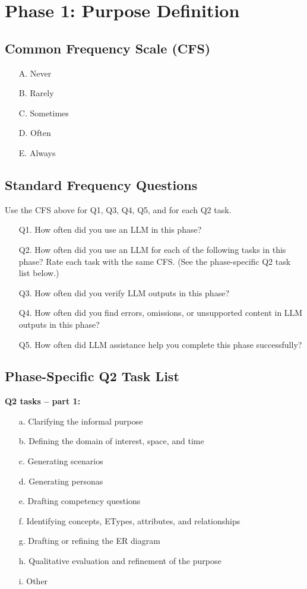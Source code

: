\section*{Phase 1: Purpose Definition}

\subsection*{Common Frequency Scale (CFS)}
\begin{itemize}
  \item[A.] Never
  \item[B.] Rarely
  \item[C.] Sometimes
  \item[D.] Often
  \item[E.] Always
\end{itemize}

\subsection*{Standard Frequency Questions}
Use the CFS above for Q1, Q3, Q4, Q5, and for each Q2 task.
\begin{enumerate}
  \item[Q1.] How often did you use an LLM in this phase?
  \item[Q2.] How often did you use an LLM for each of the following tasks in this phase? Rate each task with the same CFS. (See the phase-specific Q2 task list below.)
  \item[Q3.] How often did you verify LLM outputs in this phase?
  \item[Q4.] How often did you find errors, omissions, or unsupported content in LLM outputs in this phase?
  \item[Q5.] How often did LLM assistance help you complete this phase successfully?
\end{enumerate}

\subsection*{Phase-Specific Q2 Task List}
\textbf{Q2 tasks -- part 1:}
\begin{enumerate}
  \item[a.] Clarifying the informal purpose
  \item[b.] Defining the domain of interest, space, and time
  \item[c.] Generating scenarios
  \item[d.] Generating personas
  \item[e.] Drafting competency questions
  \item[f.] Identifying concepts, ETypes, attributes, and relationships
  \item[g.] Drafting or refining the ER diagram
  \item[h.] Qualitative evaluation and refinement of the purpose
  \item[i.] Other
\end{enumerate}

